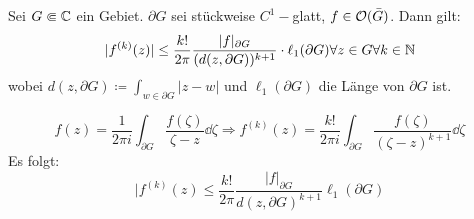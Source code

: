 \begin{satz}
	Sei $ G\Subset\mathbb{C} $ ein Gebiet. $ \partial G $ sei st\"uckweise $ C^1- $glatt, $ f\in\mathcal O(\bar G) $. Dann gilt:
	\[ |f^{(k)}(z)|\leq\frac{k!}{2\pi}\frac{|f|_{\partial G}}{(d(z,\partial G))^{k+1}}\cdot\ell_1(\partial G)\forall z\in G\forall k\in\mathbb{N} \]
	wobei $ d(z,\partial G)\coloneqq\int_{w\in\partial G} |z-w| $ und $ \ell_1(\partial G) $ die L\"ange von $ \partial G $ ist.
\end{satz}
\begin{beweis}
	\[ f(z)=\frac{1}{2\pi i}\int_{\partial G}^{}\frac{f(\zeta)}{\zeta-z}\dd\zeta\Rightarrow f^{(k)}(z)=\frac{k!}{2\pi i}\int_{\partial G}^{}\frac{f(\zeta)}{(\zeta-z)^{k+1}}\dd\zeta \]
	Es folgt:
	\[ |f^{(k)}(z)\leq\frac{k!}{2\pi}\frac{|f|_{\partial G}}{d(z,\partial G)^{k+1}}\ell_1(\partial G) \]
\end{beweis}